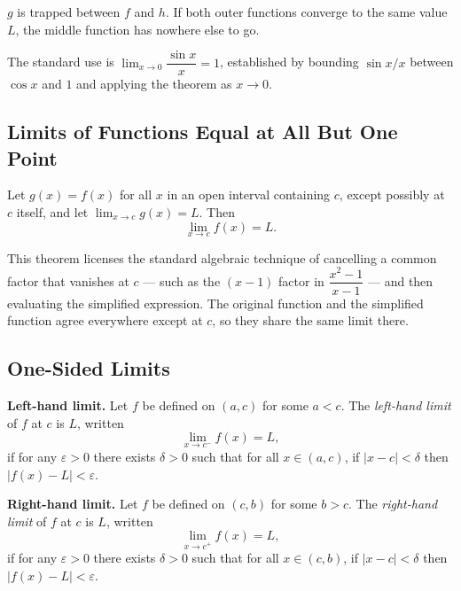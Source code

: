 \begin{remark*}[Intuition]
$g$ is trapped between $f$ and $h$.
If both outer functions converge to the same value $L$, the
middle function has nowhere else to go.
\end{remark*}

\begin{remark*}
The standard use is $\lim_{x \to 0} \dfrac{\sin x}{x} = 1$,
established by bounding $\sin x / x$ between $\cos x$ and $1$
and applying the theorem as $x \to 0$.
\end{remark*}

\subsection{Limits of Functions Equal at All But One Point}

\begin{tcolorbox}[colback=thmbox, colframe=thmborder, arc=2pt,
  left=6pt, right=6pt, top=4pt, bottom=4pt,
  title={\small\textbf{Theorem (Limits of Functions Equal at All But One Point)}},
  fonttitle=\small\bfseries]
Let $g(x) = f(x)$ for all $x$ in an open interval containing $c$,
except possibly at $c$ itself, and let $\lim_{x \to c} g(x) = L$.
Then
\[
  \lim_{x \to c} f(x) = L.
\]
\end{tcolorbox}

\begin{remark*}
This theorem licenses the standard algebraic technique of
cancelling a common factor that vanishes at $c$ --- such as
the $(x-1)$ factor in $\dfrac{x^2-1}{x-1}$ --- and then
evaluating the simplified expression.
The original function and the simplified function agree
everywhere except at $c$, so they share the same limit there.
\end{remark*}

\subsection{One-Sided Limits}

\begin{tcolorbox}[colback=propbox, colframe=propborder, arc=2pt,
  left=6pt, right=6pt, top=4pt, bottom=4pt,
  title={\small\textbf{Definition (One-Sided Limits)}},
  fonttitle=\small\bfseries]
\textbf{Left-hand limit.}
Let $f$ be defined on $(a, c)$ for some $a < c$.
The \emph{left-hand limit} of $f$ at $c$ is $L$, written
\[
  \lim_{x \to c^-} f(x) = L,
\]
if for any $\varepsilon > 0$ there exists $\delta > 0$ such that
for all $x \in (a, c)$, if $|x - c| < \delta$ then $|f(x) - L| < \varepsilon$.

\medskip
\textbf{Right-hand limit.}
Let $f$ be defined on $(c, b)$ for some $b > c$.
The \emph{right-hand limit} of $f$ at $c$ is $L$, written
\[
  \lim_{x \to c^+} f(x) = L,
\]
if for any $\varepsilon > 0$ there exists $\delta > 0$ such that
for all $x \in (c, b)$, if $|x - c| < \delta$ then $|f(x) - L| < \varepsilon$.
\end{tcolorbox}

